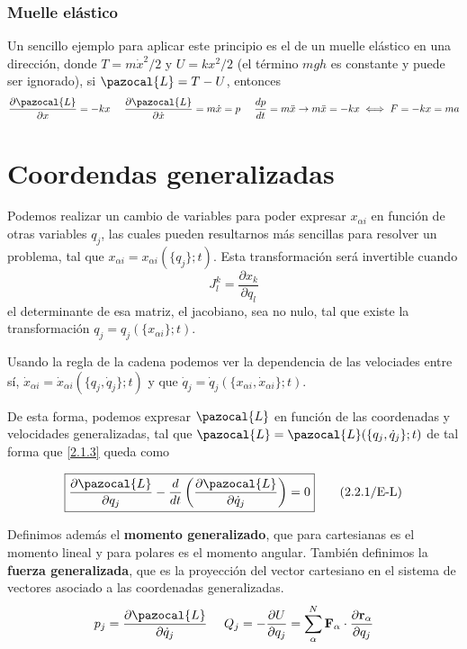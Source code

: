 \subsubsection{Muelle elástico}
Un sencillo ejemplo para aplicar este principio es el de un muelle elástico en una dirección, donde $T=m\dot{x}^2/2$ y $U = kx^2/2$ (el término $mgh$ es constante y puede ser ignorado), si $\pazocal{L} = T-U$, entonces
\[\frac{\partial \pazocal{L}}{\partial x}=-kx \ \ \ \ \frac{\partial \pazocal{L}}{\partial \dot{x}}=m\dot{x} = p \ \ \ \ \frac{d p}{dt} = m\ddot{x} \rightarrow m\ddot{x} = -kx \iff F=-kx=ma\]
\section{Coordendas generalizadas} 
Podemos realizar un cambio de variables para poder expresar $x_{\alpha i}$ en función de otras variables $q_j$, las cuales pueden resultarnos más sencillas para resolver un problema, tal que $x_{\alpha i}=x_{\alpha i}(\{q_j\};t)$. Esta transformación será invertible cuando
\[J_l^k=\frac{\partial x_k}{\partial q_l}\]
el determinante de esa matriz, el jacobiano, sea no nulo, tal que existe la transformación $q_j = q_j(\{x_{\alpha i}\};t)$.

Usando la regla de la cadena podemos ver la dependencia de las velociades entre sí, $\dot{x}_{\alpha i}=\dot{x}_{\alpha i}(\{q_j,\dot{q}_j\};t)$ y que $\dot{q}_j = \dot{q}_j(\{x_{\alpha i},\dot{x}_{\alpha i}\};t)$.

De esta forma, podemos expresar $\pazocal{L}$ en función de las coordenadas y velocidades generalizadas, tal que $\pazocal{L}=\pazocal{L}(\{q_j,\dot{q}_j\};t)$ de tal forma que \eqref{2.1.3} queda como 

\vspace{-10pt}
\Large\begin{equation} \label{2.2.1}
    \boxed{\frac{\partial \pazocal{L}}{\partial q_j} -\frac{d}{dt}\left(\frac{\partial \pazocal{L}}{\partial \dot{q}_j}\right) =0} \tag{2.2.1/E-L}
\end{equation} \normalsize

Definimos además el \textbf{momento generalizado}, que para cartesianas es el momento lineal y para polares es el momento angular. También definimos la \textbf{fuerza generalizada}, que es la proyección del vector cartesiano en el sistema de vectores asociado a las coordenadas generalizadas.
\begin{equation} \label{2.2.2}
    p_j = \frac{\partial \pazocal{L}}{\partial \dot{q}_j} \ \ \ \ Q_j = -\frac{\partial U}{\partial q_j}=\sum_\alpha^N{\mathbf{F}_\alpha\cdot \frac{\partial \mathbf{r}_{\alpha}}{\partial q_j}}
\end{equation} 
\vspace{-30pt}
